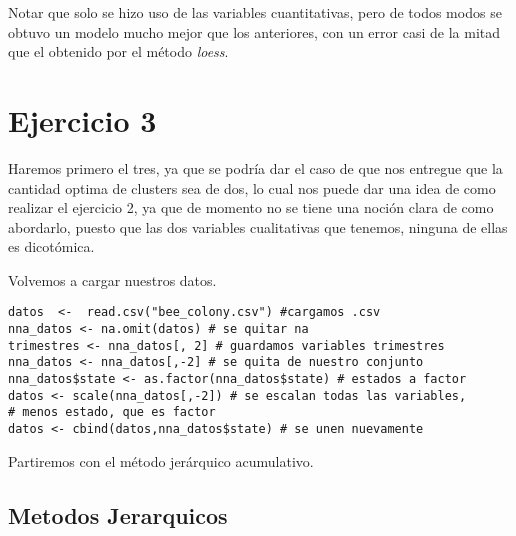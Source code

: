 \documentclass[b4paper]{article}
\begin{document}
    Notar que solo se hizo uso de las variables cuantitativas, pero de todos modos se
    obtuvo un modelo mucho mejor que los anteriores, con un error casi de la mitad que
    el obtenido por el m\'etodo \textit{loess}.
    \section{Ejercicio 3}
    Haremos primero el tres, ya que se podr\'ia dar el caso de que nos entregue que la cantidad optima de clusters sea de dos, lo cual nos puede dar una idea de como realizar el ejercicio 2, ya que de momento no se tiene una noci\'on clara de como abordarlo, puesto que las dos variables cualitativas que tenemos, ninguna de ellas es dicot\'omica.
    
    Volvemos a cargar nuestros datos.
    \begin{tcolorbox}
        \begin{verbatim}
datos  <-  read.csv("bee_colony.csv") #cargamos .csv
nna_datos <- na.omit(datos) # se quitar na
trimestres <- nna_datos[, 2] # guardamos variables trimestres
nna_datos <- nna_datos[,-2] # se quita de nuestro conjunto
nna_datos$state <- as.factor(nna_datos$state) # estados a factor
datos <- scale(nna_datos[,-2]) # se escalan todas las variables,
# menos estado, que es factor
datos <- cbind(datos,nna_datos$state) # se unen nuevamente\end{verbatim}
    \end{tcolorbox}
    Partiremos con el m\'etodo jer\'arquico acumulativo.
    \subsection{Metodos Jerarquicos}
\end{document}
